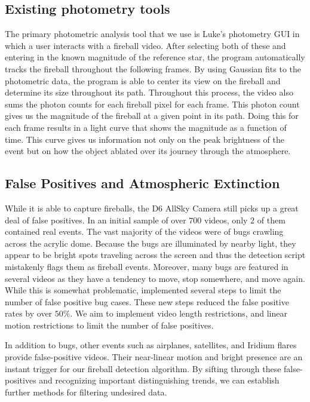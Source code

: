 \subsection{Existing photometry tools}
The primary photometric analysis tool that we use is Luke's photometry GUI in which a user interacts with a fireball video.
After selecting both of these and entering in the known magnitude of the reference star, the program automatically tracks the fireball throughout the following frames.
By using Gaussian fits to the photometric data, the program is able to center its view on the fireball and determine its size throughout its path.
Throughout this process, the video also sums the photon counts for each fireball pixel for each frame.
This photon count gives us the magnitude of the fireball at a given point in its path.
Doing this for each frame results in a light curve that shows the magnitude as a function of time.
This curve gives us information not only on the peak brightness of the event but on how the object ablated over its journey through the atmosphere.

\subsection{False Positives and Atmospheric Extinction}

While it is able to capture fireballs, the D6 AllSky Camera still picks up a great deal of false positives.
In an initial sample of over $700$ videos, only $2$ of them contained real events.
The vast majority of the videos were of bugs crawling across the acrylic dome.
Because the bugs are illuminated by nearby light, they appear to be bright spots traveling across the screen and thus the detection script mistakenly flags them as fireball events.
Moreover, many bugs are featured in several videos as they have a tendency to move, stop somewhere, and move again.
While this is somewhat problematic, implemented several steps to limit the number of false positive bug cases. 
These new steps reduced the false positive rates by over $50\%$.
We aim to implement video length restrictions, and linear motion restrictions to limit the number of false positives.

In addition to bugs, other events such as airplanes, satellites, and Iridium flares provide false-positive videos.
Their near-linear motion and bright presence are an instant trigger for our fireball detection algorithm.  
By sifting through these false-positives and recognizing important distinguishing trends, we can establish further methods for filtering undesired data.

